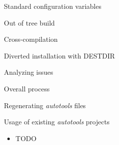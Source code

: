 \begin{frame}{Standard configuration variables}

\end{frame}

\begin{frame}{Out of tree build}

\end{frame}

\begin{frame}{Cross-compilation}

\end{frame}

\begin{frame}{Diverted installation with DESTDIR}

\end{frame}

\begin{frame}{Analyzing issues}

\end{frame}

\begin{frame}{Overall process}

\end{frame}

\begin{frame}{Regenerating {\em autotools} files}

\end{frame}

\setuplabframe
{Usage of existing {\em autotools} projects}
{
  \begin{itemize}
  \item TODO
  \end{itemize}
}
